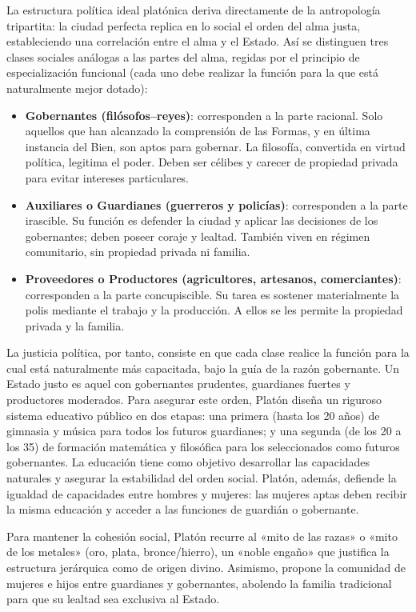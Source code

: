 \documentclass[10pt]{article}
\begin{document}
La estructura política ideal platónica deriva directamente de la antropología tripartita: la ciudad perfecta replica en lo social el orden del alma justa, estableciendo una correlación entre el alma y el Estado. Así se distinguen tres clases sociales análogas a las partes del alma, regidas por el principio de especialización funcional (cada uno debe realizar la función para la que está naturalmente mejor dotado):

\begin{itemize}
  \item \textbf{Gobernantes (filósofos–reyes)}: corresponden a la parte racional. Solo aquellos que han alcanzado la comprensión de las Formas, y en última instancia del Bien, 
    son aptos para gobernar. La filosofía, convertida en virtud política, legitima el poder. Deben ser célibes y carecer de propiedad privada para evitar intereses particulares.
  \item \textbf{Auxiliares o Guardianes (guerreros y policías)}: corresponden a la parte irascible. Su función es defender la ciudad y aplicar las decisiones de los gobernantes; 
    deben poseer coraje y lealtad. También viven en régimen comunitario, sin propiedad privada ni familia.
  \item \textbf{Proveedores o Productores (agricultores, artesanos, comerciantes)}: corresponden a la parte concupiscible. Su tarea es sostener materialmente la polis mediante el 
    trabajo y la producción. A ellos se les permite la propiedad privada y la familia.
\end{itemize}

La justicia política, por tanto, consiste en que cada clase realice la función para la cual está naturalmente más capacitada, bajo la guía de la razón gobernante. Un Estado justo es 
aquel con gobernantes prudentes, guardianes fuertes y productores moderados.
Para asegurar este orden, Platón diseña un riguroso sistema educativo público en dos etapas: una primera (hasta los 20 años) de gimnasia y música para todos los futuros guardianes; y 
una segunda (de los 20 a los 35) de formación matemática y filosófica para los seleccionados como futuros gobernantes. La educación tiene como objetivo desarrollar las capacidades 
naturales y asegurar la estabilidad del orden social. Platón, además, defiende la igualdad de capacidades entre hombres y mujeres: las mujeres aptas deben recibir la misma educación 
y acceder a las funciones de guardián o gobernante.

Para mantener la cohesión social, Platón recurre al «mito de las razas» o «mito de los metales» (oro, plata, bronce/hierro), un «noble engaño» que justifica la estructura jerárquica 
como de origen divino. Asimismo, propone la comunidad de mujeres e hijos entre guardianes y gobernantes, abolendo la familia tradicional para que su lealtad sea exclusiva al Estado.
\end{document}
